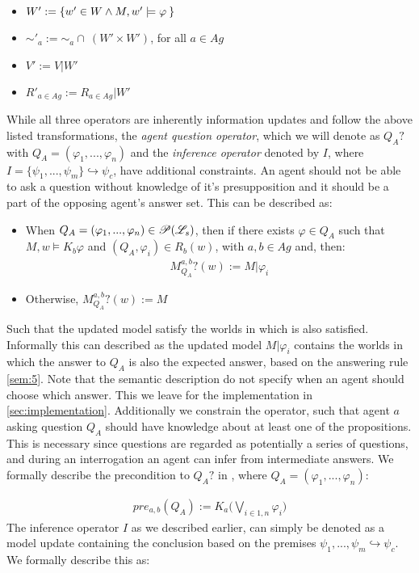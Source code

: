 \begin{itemize}
    \item $W' := \left\{ w' \in W \land M, w' \models \varphi\: \right\}$
    \item $\sim'_a := \sim_a \cap \:(W' \times W')$, for all $a \in Ag$
    \item $V' := V | W'$
    \item $R'_{a\in Ag} := R_{a\in Ag} | W'$
\end{itemize}
While all three operators are inherently information updates and follow the above listed transformations, the \textit{agent question operator}, which we will denote as $Q_{A}?$ with $Q_A = (\varphi_1,...,\varphi_n)$ and the \textit{inference operator} denoted by $I$, where $I = \{\psi_1,...,\psi_m \}\hookrightarrow \psi_c$, have additional constraints. An agent should not be able to ask a question without knowledge of it's presupposition and it should be a part of the opposing agent's answer set. This can be described as:
\begin{itemize}
    \item When $Q_A = (\varphi_1,...,\varphi_n) \in \mathscr{P}(\mathscr{L}_s)$, then if there
          exists $\varphi \in Q_A$ such that $M, w \models K_b\varphi$ and $(Q_A,
              \varphi_i) \in R_b (w)$, with $a, b \in Ag$ and, then:
          \begin{align}
              M^{a,b}_{Q_A}?(w) := M |\varphi_i
          \end{align}
    \item Otherwise, $M^{a,b}_{Q_{A}}?(w) := M$
\end{itemize}
Such that the updated model satisfy the worlds in which \proposition\: is also satisfied. Informally this can described as the updated model $M|\varphi_i$ contains the worlds in which the answer to $Q_A$ is also the expected answer, based on the answering rule \cref{sem:5}. Note that the semantic description do not specify when an agent should choose which answer. This we leave for the implementation in \cref{sec:implementation}. Additionally we constrain the operator, such that agent $a$ asking question $Q_A$ should have knowledge about at least one of the propositions. This is necessary since questions are regarded as potentially a series of questions, and during an interrogation an agent can infer from intermediate answers. We formally describe the precondition to $Q_A?$ in \dynlang, where $Q_A = (\varphi_1,...,\varphi_n)$:

\begin{gather}
    pre_{a,b}(Q_A) := K_a\Biggl(\bigvee\limits_{i\in 1,n}\varphi_i\Biggr)
\end{gather}
The inference operator $I$ as we described earlier, can simply be denoted as a model update containing the conclusion based on the premises ${\psi_1,...,\psi_m} \hookrightarrow \psi_c$. We formally describe this as:

